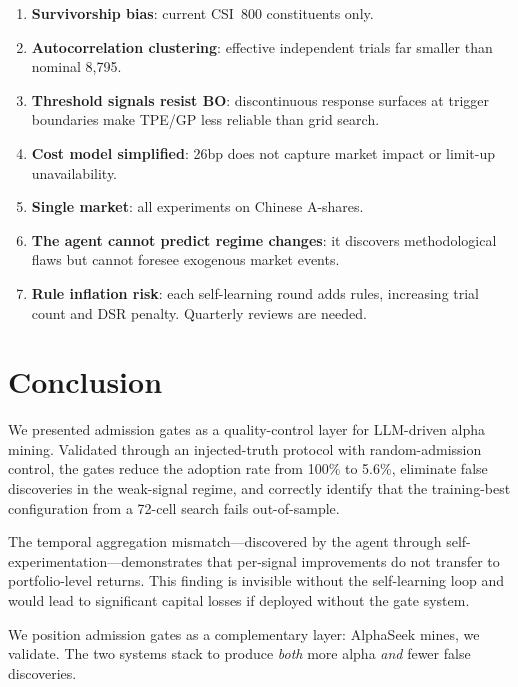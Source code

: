 \documentclass[11pt]{article}
\begin{document}
\begin{enumerate}
\item \textbf{Survivorship bias}: current CSI~800 constituents only.
\item \textbf{Autocorrelation clustering}: effective independent trials far
  smaller than nominal 8{,}795.
\item \textbf{Threshold signals resist BO}: discontinuous response surfaces
  at trigger boundaries make TPE/GP less reliable than grid search.
\item \textbf{Cost model simplified}: 26bp does not capture market impact or
  limit-up unavailability.
\item \textbf{Single market}: all experiments on Chinese A-shares.
\item \textbf{The agent cannot predict regime changes}: it discovers
  methodological flaws but cannot foresee exogenous market events.
\item \textbf{Rule inflation risk}: each self-learning round adds rules,
  increasing trial count and DSR penalty. Quarterly reviews are needed.
\end{enumerate}

\section{Conclusion}

We presented admission gates as a quality-control layer for LLM-driven alpha
mining. Validated through an injected-truth protocol with random-admission
control, the gates reduce the adoption rate from 100\% to 5.6\%, eliminate
false discoveries in the weak-signal regime, and correctly identify that the
training-best configuration from a 72-cell search fails out-of-sample.

The temporal aggregation mismatch---discovered by the agent through
self-experimentation---demonstrates that per-signal improvements do not
transfer to portfolio-level returns. This finding is invisible without the
self-learning loop and would lead to significant capital losses if deployed
without the gate system.

We position admission gates as a complementary layer: AlphaSeek mines,
we validate. The two systems stack to produce \emph{both} more alpha
\emph{and} fewer false discoveries.
\end{document}
